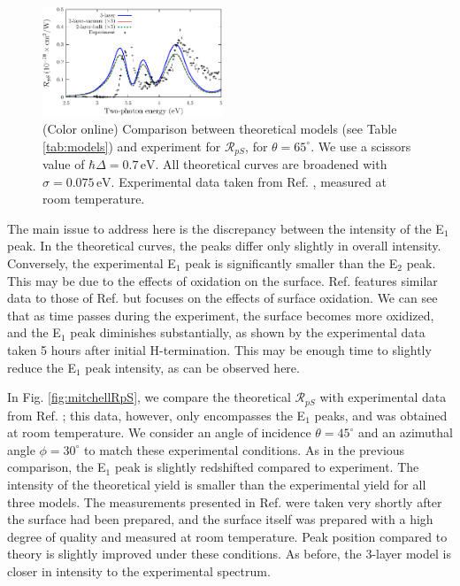 \documentclass[prb,superscriptaddress,showpacs,twocolumn,letterpaper]{revtex4}
\begin{document}
\begin{figure}[b]
\centering
\includegraphics[width=0.48\textwidth]{plots/fig3}
\caption{(Color online) Comparison between theoretical models (see Table
\ref{tab:models}) and experiment for $\mathcal{R}_{pS}$, for
$\theta=65^{\circ}$. We use a scissors value of $\hbar\Delta = 0.7\,\text{eV}$.
All theoretical curves are broadened with $\sigma=0.075\,\text{eV}$.
Experimental data taken from Ref. , measured at room
temperature.
\label{fig:RpS}}
\end{figure}

The main issue to address here is the discrepancy between the intensity of the
E$_{1}$ peak. In the theoretical curves, the peaks differ only slightly in
overall intensity. Conversely, the experimental E$_{1}$ peak is significantly
smaller than the E$_{2}$ peak. This may be due to the effects of oxidation on
the surface. Ref.  features similar data to those of
Ref.  but focuses on the effects of surface oxidation. We
can see that as time passes during the experiment, the surface becomes more
oxidized, and the E$_{1}$ peak diminishes substantially, as shown by the
experimental data taken 5 hours after initial H-termination. This may be enough
time to slightly reduce the E$_{1}$ peak intensity, as can be observed here.

In Fig. \ref{fig:mitchellRpS}, we compare the theoretical $\mathcal{R}_{pS}$
with experimental data from Ref. ; this data, however,
only encompasses the E$_{1}$ peaks, and was obtained at room temperature. We
consider an angle of incidence $\theta=45^\circ$ and an azimuthal angle
$\phi=30^\circ$ to match these experimental conditions. As in the previous
comparison, the E$_{1}$ peak is slightly redshifted compared to experiment. The
intensity of the theoretical yield is smaller than the experimental yield for
all three models. The measurements presented in Ref. 
were taken very shortly after the surface had been prepared, and the surface
itself was prepared with a high degree of quality and measured at room
temperature. Peak position compared to theory is slightly improved under these
conditions. As before, the 3-layer model is closer in intensity to
the experimental spectrum.
\end{document}
